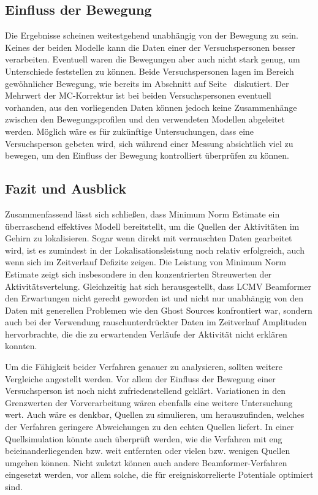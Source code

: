 \documentclass[doc,a4paper,12pt]{apa6}
\makeatletter
\DeclareRobustCommand*{\nameref}[1]{%
      \glqq{\myorg@nameref{#1}}\grqq%
    }%
\makeatother
\begin{document}
\subsection{Einfluss der Bewegung}

Die Ergebnisse scheinen weitestgehend unabhängig von der Bewegung zu sein. Keines der beiden Modelle kann die Daten einer der Versuchspersonen besser verarbeiten. Eventuell waren die Bewegungen aber auch nicht stark genug, um Unterschiede feststellen zu können. Beide Versuchspersonen lagen im Bereich gewöhnlicher Bewegung, wie bereits im Abschnitt \nameref{sec:ergebnis-vorverarbeitung} auf Seite~\pageref{sec:ergebnis-vorverarbeitung} diskutiert. Der Mehrwert der MC-Korrektur ist bei beiden Versuchspersonen eventuell vorhanden, aus den vorliegenden Daten können jedoch keine Zusammenhänge zwischen den Bewegungsprofilen und den verwendeten Modellen abgeleitet werden. Möglich wäre es für zukünftige Untersuchungen, dass eine Versuchsperson gebeten wird, sich während einer Messung absichtlich viel zu bewegen, um den Einfluss der Bewegung kontrolliert überprüfen zu können.

\subsection{Fazit und Ausblick}

Zusammenfassend lässt sich schließen, dass Minimum Norm Estimate ein überraschend effektives Modell bereitstellt, um die Quellen der Aktivitäten im Gehirn zu lokalisieren. Sogar wenn direkt mit verrauschten Daten gearbeitet wird, ist es zumindest in der Lokalisationsleistung noch relativ erfolgreich, auch wenn sich im Zeitverlauf Defizite zeigen. Die Leistung von Minimum Norm Estimate zeigt sich insbesondere in den konzentrierten Streuwerten der Aktivitätsvertelung. Gleichzeitig hat sich herausgestellt, dass LCMV Beamformer den Erwartungen nicht gerecht geworden ist und nicht nur unabhängig von den Daten mit generellen Problemen wie den Ghost Sources konfrontiert war, sondern auch bei der Verwendung rauschunterdrückter Daten im Zeitverlauf Amplituden hervorbrachte, die die zu erwartenden Verläufe der Aktivität nicht erklären konnten.

Um die Fähigkeit beider Verfahren genauer zu analysieren, sollten weitere Vergleiche angestellt werden. Vor allem der Einfluss der Bewegung einer Versuchsperson ist noch nicht zufriedenstellend geklärt. Variationen in den Grenzwerten der Vorverarbeitung wären ebenfalls eine weitere Untersuchung wert. Auch wäre es denkbar, Quellen zu simulieren, um herauszufinden, welches der Verfahren geringere Abweichungen zu den echten Quellen liefert. In einer Quellsimulation könnte auch überprüft werden, wie die Verfahren mit eng beieinanderliegenden bzw. weit entfernten oder vielen bzw. wenigen Quellen umgehen können. Nicht zuletzt können auch andere Beamformer-Verfahren eingesetzt werden, vor allem solche, die für ereigniskorrelierte Potentiale optimiert sind.
\end{document}

